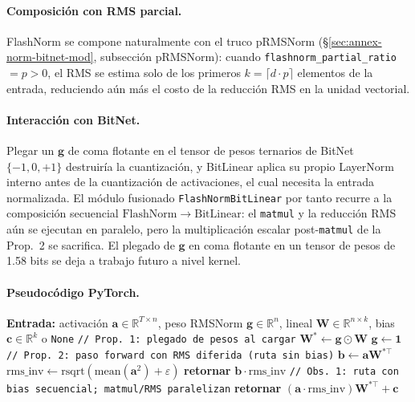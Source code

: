\paragraph{Composición con RMS parcial.}
FlashNorm se compone naturalmente con el truco pRMSNorm (§\ref{sec:annex-norm-bitnet-mod}, subsección pRMSNorm): cuando \texttt{flashnorm\_partial\_ratio} $=p>0$, el RMS se estima solo de los primeros $k=\lceil d\cdot p\rceil$ elementos de la entrada, reduciendo aún más el costo de la reducción RMS en la unidad vectorial.

\paragraph{Interacción con BitNet.}
Plegar un $\mathbf{g}$ de coma flotante en el tensor de pesos ternarios de BitNet $\{-1,0,+1\}$ \citep{wang_bitnet_2023} destruiría la cuantización, y BitLinear aplica su propio LayerNorm interno antes de la cuantización de activaciones, el cual necesita la entrada normalizada. El módulo fusionado \texttt{FlashNormBitLinear} por tanto recurre a la composición secuencial $\mathrm{FlashNorm}\to\mathrm{BitLinear}$: el \texttt{matmul} y la reducción RMS aún se ejecutan en paralelo, pero la multiplicación escalar post-\texttt{matmul} de la Prop.~2 se sacrifica. El plegado de $\mathbf{g}$ en coma flotante en un tensor de pesos de 1.58 bits se deja a trabajo futuro a nivel kernel.

\paragraph{Pseudocódigo PyTorch.}
\begin{algorithmic}[1]
\State \textbf{Entrada:} activación $\mathbf{a}\in\mathbb{R}^{T\times n}$, peso RMSNorm $\mathbf{g}\in\mathbb{R}^{n}$, lineal $\mathbf{W}\in\mathbb{R}^{n\times k}$, bias $\mathbf{c}\in\mathbb{R}^{k}$ o \texttt{None}
\State \texttt{// Prop. 1: plegado de pesos al cargar}
\State $\mathbf{W}^{*}\gets \mathbf{g}\odot\mathbf{W}$ 
\State $\mathbf{g}\gets \mathbf{1}$ 
\State \texttt{// Prop. 2: paso forward con RMS diferida (ruta sin bias)}
\State $\mathbf{b}\gets \mathbf{a}\mathbf{W}^{*\top}$ 
\State $\mathrm{rms\_inv}\gets \mathrm{rsqrt}(\mathrm{mean}(\mathbf{a}^{2})+\varepsilon)$ 
    \State \textbf{retornar} $\mathbf{b}\cdot\mathrm{rms\_inv}$ 
\Else
    \State \texttt{// Obs. 1: ruta con bias secuencial; matmul/RMS paralelizan}
    \State \textbf{retornar} $(\mathbf{a}\cdot\mathrm{rms\_inv})\mathbf{W}^{*\top}+\mathbf{c}$
\EndIf
\end{algorithmic}

